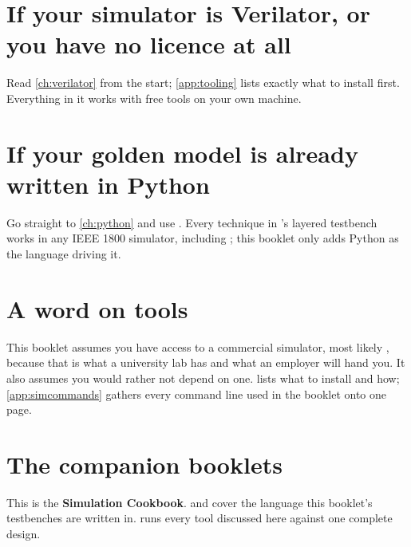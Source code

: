 \section*{If your simulator is Verilator, or you have no licence at all}

Read \cref{ch:verilator} from the start; \cref{app:tooling} lists exactly
what to install first. Everything in it works with free tools on your own
machine.

\section*{If your golden model is already written in Python}

Go straight to \cref{ch:python} and use . Every technique in
's layered testbench works in any IEEE 1800 simulator,
including ; this booklet only adds Python as the language
driving it.

\section*{A word on tools}

This booklet assumes you have access to a commercial simulator, most likely
, because that is what a university lab has and what an
employer will hand you. It also assumes you would rather not depend on one.
 lists what to install and how; \cref{app:simcommands}
gathers every command line used in the booklet onto one page.

\section*{The companion booklets}

This is the \textbf{Simulation Cookbook}.  and
 cover the language this booklet's testbenches are
written in.  runs every tool discussed here against one
complete design.
